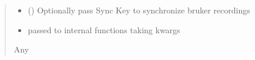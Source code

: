 \documentclass[letterpaper,10pt,english]{sphinxmanual}
\begin{document}
\begin{fulllineitems}
\begin{fulllineitems}
\begin{quote}
\begin{description}
\begin{itemize}
\item {} 
\sphinxAtStartPar
{} (\sphinxstyleliteralemphasis{\sphinxupquote{{[}}}\sphinxstyleliteralemphasis{\sphinxupquote{, }}\sphinxstyleliteralemphasis{\sphinxupquote{{]}}}) \textendash{} Optionally pass Sync Key to synchronize bruker recordings

\item {} 
\sphinxAtStartPar
{} \textendash{} passed to internal functions taking kwargs

\end{itemize}

\sphinxAtStartPar
Any

\end{description}\end{quote}

\end{fulllineitems}


\end{fulllineitems}

\end{document}
